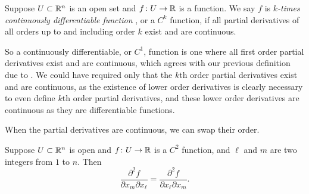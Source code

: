 \begin{defn}
Suppose $U \subset {\mathbb{R}}^n$ is an open set and
$f \colon U \to {\mathbb{R}}$ is a function.  We say $f$ is
\emph{$k$-times continuously differentiable function}%
,
or a $C^k$ function, if all partial derivatives of all orders up to and
including order $k$ exist and are continuous.
\end{defn}

So a continuously differentiable, or $C^1$, function is one where all
first order partial
derivatives exist and are continuous, which agrees with our previous
definition due to .  We
could have required only that the $k$th order partial derivatives exist and
are continuous, as the existence of lower order derivatives is clearly
necessary to even define $k$th order partial derivatives,
and these lower order derivatives are continuous as they are differentiable
functions.

When the partial derivatives are continuous, we can swap their order.

\begin{prop} \label{mv:prop:swapders}
Suppose $U \subset {\mathbb{R}}^n$ is open and $f \colon U \to {\mathbb{R}}$ is a $C^2$
function, and $\ell$ and $m$ are two integers from $1$ to $n$.  Then
\begin{equation*}
\frac{\partial^2 f}{\partial x_m \partial x_{\ell}}
=
\frac{\partial^2 f}{\partial x_{\ell} \partial x_m} .
\end{equation*}
\end{prop}

